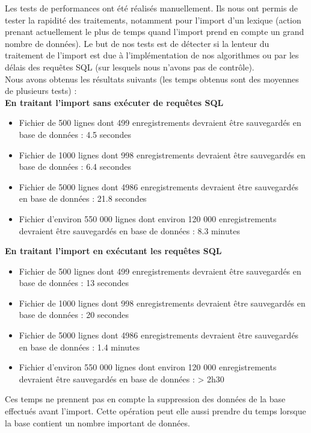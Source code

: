 \documentclass[12pt,a4paper]{article}
\begin{document}
    Les tests de performances ont été réalisés manuellement. Ils nous ont permis de tester la rapidité des traitements, notamment pour l'import d'un lexique (action prenant actuellement le plus de temps quand l'import prend en compte un grand nombre de données).
    Le but de nos tests est de détecter si la lenteur du traitement de l'import est due à l'implémentation de nos algorithmes ou par les délais des requêtes SQL (sur lesquels nous n'avons pas de contrôle). \\
    Nous avons obtenus les résultats suivants (les temps obtenus sont des moyennes de plusieurs tests) : \\
    \textbf{En traitant l'import sans exécuter de requêtes SQL} \\
    \begin{itemize}
        \item Fichier de 500 lignes dont 499 enregistrements devraient être sauvegardés en base de données : 4.5 secondes
        \item Fichier de 1000 lignes dont 998 enregistrements devraient être sauvegardés en base de données : 6.4 secondes
        \item Fichier de 5000 lignes dont 4986 enregistrements devraient être sauvegardés en base de données : 21.8 secondes
        \item Fichier d'environ 550 000 lignes dont environ 120 000 enregistrements devraient être sauvegardés en base de données : 8.3 minutes
    \end{itemize}

    \textbf{En traitant l'import en exécutant les requêtes SQL} \\
    \begin{itemize}
        \item Fichier de 500 lignes dont 499 enregistrements devraient être sauvegardés en base de données : 13 secondes
        \item Fichier de 1000 lignes dont 998 enregistrements devraient être sauvegardés en base de données : 20 secondes
        \item Fichier de 5000 lignes dont 4986 enregistrements devraient être sauvegardés en base de données : 1.4 minutes
        \item Fichier d'environ 550 000 lignes dont environ 120 000 enregistrements devraient être sauvegardés en base de données : > 2h30
    \end{itemize}

    \smallbreak
    Ces temps ne prennent pas en compte la suppression des données de la base effectués avant l'import. Cette opération peut elle aussi prendre du temps lorsque la base contient un nombre important de données.
\end{document}
